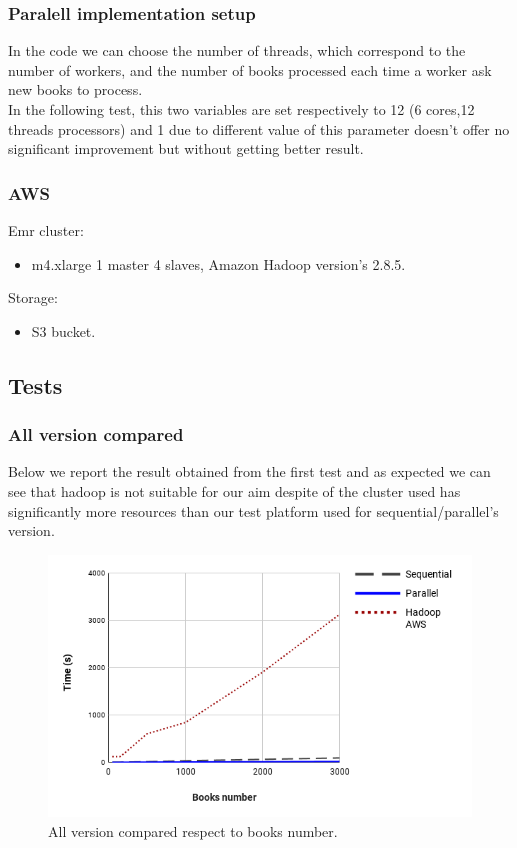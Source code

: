\documentclass[10pt,twocolumn,letterpaper]{article}
\begin{document}
\subsubsection{Paralell implementation setup}

In the code we can choose the number of threads, which correspond to the number of workers, and the number of books processed each time a worker ask new books to process.\\
In the following test, this two variables are set respectively to 12 (6 cores,12 threads processors) and 1 due to different value of this parameter doesn't offer no significant improvement but without getting better result.

\subsubsection{AWS}

Emr cluster: 
\begin{itemize}
    \item m4.xlarge 1 master 4 slaves, Amazon Hadoop version's  2.8.5.
\end{itemize}
Storage:
\begin{itemize}
    \item S3 bucket.
\end{itemize}
\subsection{Tests}
\subsubsection{All version compared}

Below we report the result obtained from the first test and as expected we can see that hadoop is not suitable for our aim despite of the cluster used has significantly more resources than our test platform used for sequential/parallel's version.

\begin{figure}[H]
\begin{center}
\includegraphics[width=\columnwidth]{template/latex/books.png}
\caption{All version compared respect to books number.}
\label{fig:short}
\end{center}
\end{figure}
\end{document}
